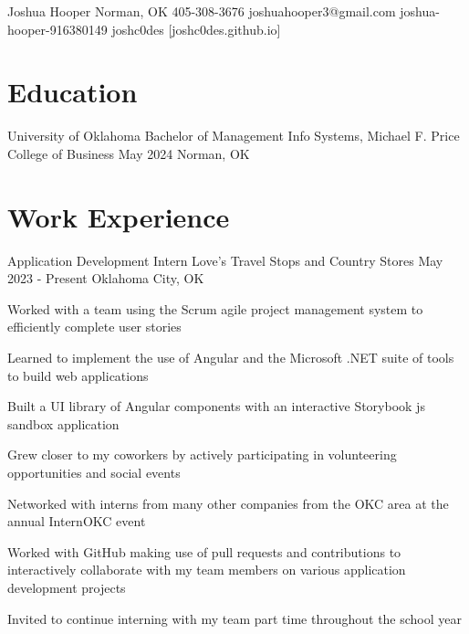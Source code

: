 \documentclass[letterpaper]{resumeconfig}
\begin{document}
\Header
    {Joshua Hooper} %
    {Norman, OK} %
    {405-308-3676} %
    {joshuahooper3@gmail.com} %
    {joshua-hooper-916380149} %
    {joshc0des} %
    [joshc0des.github.io] %


\section{Education}

\Education
    {University of Oklahoma} %
    {Bachelor of Management Info Systems, Michael F. Price College of Business} %
    {May 2024} %
    {Norman, OK} %
    \vspace{-1em}


\section{Work Experience}

\WorkExperience
    {Application Development Intern} %
    {Love's Travel Stops and Country Stores} %
    {May 2023 - Present} %
    {Oklahoma City, OK} %
    {
        \item Worked with a team using the Scrum agile project management system to efficiently complete user stories
        \item Learned to implement the use of Angular and the Microsoft .NET suite of tools to build web applications
        \item Built a UI library of Angular components with an interactive Storybook js sandbox application
        \item Grew closer to my coworkers by actively participating in volunteering opportunities and social events
        \item Networked with interns from many other companies from the OKC area at the annual InternOKC event
        \item Worked with GitHub making use of pull requests and contributions to interactively collaborate with my team members on various application development projects
        \item Invited to continue interning with my team part time throughout the school year
    }
    \vspace{1em}
\end{document}

